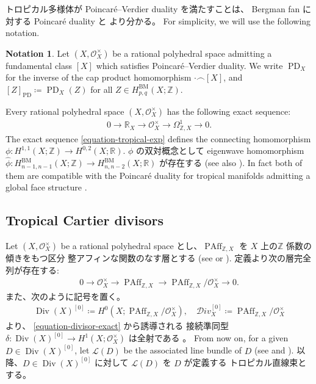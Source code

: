 \documentclass[a4paper,dvipdfmx,reqno,12pt]{amsart}
\theoremstyle{definition}
\newtheorem{notation}[theorem]{Notation}
\newcommand{\deq}{\coloneqq}
\newcommand{\opn}[1]{\operatorname{#1}}
\newcommand{\PD}[1]{[#1]_{\mathrm{PD}}}
\numberwithin{equation}{section}
\begin{document}
トロピカル多様体が
Poincar\'e--Verdier duality を満たすことは、
Bergman fan に対する Poincar\'e duality
\cite[Proposition 5.5]{MR3894860} と
\cite[Theorem 6.7]{MR4637248}
より分かる。
For simplicity, we will use the following notation.
\begin{notation}
Let $(X,\mathcal{O}_X^{\times})$ be
a rational polyhedral space admitting
a fundamental class $[X]$ which satisfies
Poincar\'e--Verdier duality.
We write $\opn{PD}_X$ for the inverse of
the cap product homomorphism $\cdot \frown [X]$,
and $\PD{Z}\deq \opn{PD}_X(Z)$ for all 
$Z\in H^{\mathrm{BM}}_{p,q}(X;\mathbb{Z})$.
\end{notation}


Every rational polyhedral space $(X,\mathcal{O}_X^{\times})$
has the following exact sequence:
\begin{align}
\label{equation-tropical-exp}
0\to \mathbb{R}_X \to 
\mathcal{O}_X^{\times} \to \Omega_{\mathbb{Z},X}^{1}\to 0.
\end{align}
The exact sequence \eqref{equation-tropical-exp}
defines
the connecting homomorphism
$\phi \colon H^{1,1}(X;\mathbb{Z})
\to H^{0,2}(X;\mathbb{R})$.
$\phi$ の双対概念として
eigenwave homomorphism
$\hat{\phi} \colon
H_{n-1,n-1}^{\mathrm{BM}}(X;\mathbb{Z})
\to H_{n,n-2}^{\mathrm{BM}}(X;\mathbb{R})$
が存在する \cite[(5.2)]{MR3330789}
(see also \cite[Definition 2.9]{MR3894860}).
In fact both of them are compatible with 
the Poincar\'e duality for tropical manifolds
admitting a global face structure
\cite[Lemma 5.13]{MR3894860}.

\subsection{Tropical Cartier divisors}
Let 
$(X,\mathcal{O}_X^{\times})$ be a rational polyhedral space
とし、$\opn{PAff}_{\mathbb{Z},X}$ を
$X$ 上の$\mathbb{Z}$ 係数の傾きをもつ区分
整アフィンな関数のなす層とする
(see \cite[Definition 4.1]{MR3894860}
or \cite[Definition 3.8 and Remark
3.9]{MR4637248}).
定義より次の層完全列が存在する:
\begin{align}
\label{equation-divisor-exact}
0 \to  \mathcal{O}_X^{\times} 
\to \opn{PAff}_{\mathbb{Z},X} \to 
\opn{PAff}_{\mathbb{Z},X}/\mathcal{O}_X^{\times}
\to 0.
\end{align}
また、次のように記号を置く。
\begin{align}
\opn{Div}(X)^{[0]}\deq H^{0}(X;
\opn{PAff}_{\mathbb{Z},X}/\mathcal{O}_X^{\times}), 
\quad \mathcal{D}iv_X^{[0]}\deq \opn{PAff}_{\mathbb{Z},X}/\mathcal{O}_X^{\times}
\end{align}
\cite[Lemma 4.5]{MR3894860} より、
\eqref{equation-divisor-exact} から誘導される
接続準同型
$\delta \colon \opn{Div}(X)^{[0]}\to 
H^{1}(X;\mathcal{O}_X^{\times})$ は全射である
\cite[Proposition 4.6]{MR3894860}。
From now on, for a given $D\in \opn{Div}(X)^{[0]}$,
let $\mathcal{L}(D)$ be the associated
line bundle of $D$
(see \cite[\textsection ]{MR4637248} and ).
以降、$D\in \opn{Div}(X)^{[0]}$ に対して
$\mathcal{L}(D)$ を $D$ が定義する
トロピカル直線束とする。
\end{document}
